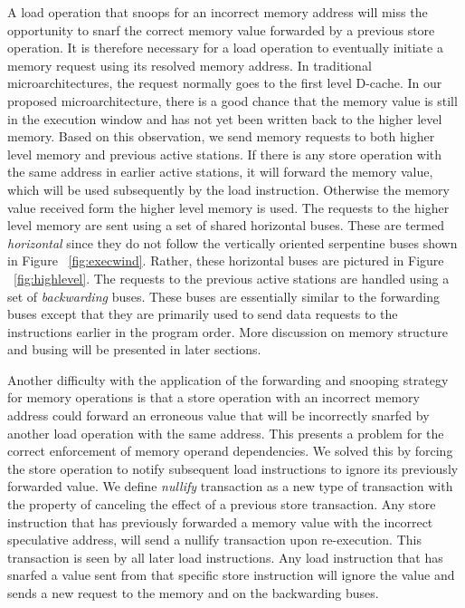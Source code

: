 \documentclass[10pt,twocolumn]{IEEEtran}
\begin{document}
A load operation that snoops for an incorrect memory address will miss
the opportunity to snarf the correct memory value forwarded by a
previous store operation.  It is therefore necessary for a load
operation to eventually initiate a memory request using its resolved memory
address.  In traditional microarchitectures, the request normally goes
to the first level D-cache.  In our proposed microarchitecture, there
is a good chance that the memory value is still in the execution window
and has not yet been written back to the higher level memory.  
Based on this
observation, we send memory requests to both higher level
memory and previous active stations.  If there is any store operation
with the same address in earlier active stations, it will forward
the memory value, which will be used subsequently by the load
instruction.  Otherwise the memory value received form the higher level
memory is used.  The requests to the higher level memory are sent
using a set of shared horizontal buses.  
These are termed \emph{horizontal}
since they do not follow the vertically oriented serpentine
buses shown in Figure ~\ref{fig:execwind}.  Rather, these horizontal
buses are pictured in Figure ~\ref{fig:highlevel}.
The requests to the previous
active stations are handled using a set of \emph{backwarding} buses.  
These
buses are essentially similar to the forwarding buses except that they
are primarily used to send data requests to the instructions earlier in
the program order.   More discussion on memory structure and busing
will be presented in later sections.

Another difficulty with the application of the forwarding and snooping
strategy for memory operations is that a store operation with an
incorrect memory address could forward an erroneous value that will be
incorrectly snarfed by another load operation with the same address.
This presents a problem for the correct enforcement of memory operand
dependencies.  We solved this by forcing the store operation to notify
subsequent load instructions to ignore its previously forwarded value.
We define \emph{nullify} transaction as a new type of transaction with
the property of canceling the effect of a previous store transaction.
Any store instruction that has previously forwarded a memory value with
the incorrect speculative address, will send a nullify transaction upon
re-execution.  This transaction is seen by all later load
instructions.  Any load instruction that has snarfed a value sent from
that specific store instruction will ignore the value and sends a new
request to the memory and on the backwarding buses.
\end{document}
